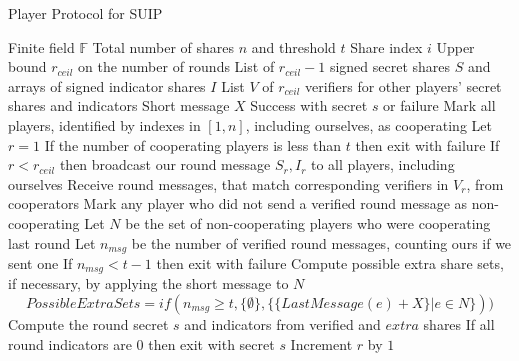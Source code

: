 \documentclass[12pt]{dalcsthesis}
\begin{document}
\begin{algorithm}
  \caption{Player Protocol for SUIP}
  \label{alg:SUIP:Player}
  \begin{algorithmic}
    \INPUT Finite field $\mathbb{F}$
    \INPUT Total number of shares $n$ and threshold $t$
    \INPUT Share index $i$
    \INPUT Upper bound $r_{ceil}$ on the number of rounds
    \INPUT List of $r_{ceil}-1$ signed secret shares $S$ and arrays of signed indicator shares $I$
    \INPUT List $V$ of $r_{ceil}$ verifiers for other players' secret shares and indicators
    \INPUT Short message $X$
    \OUTPUT Success with secret $s$ or failure
    \STATE Mark all players, identified by indexes in $[1, n]$, including ourselves, as cooperating
    \STATE Let $r = 1$
      \STATE If the number of cooperating players is less than $t$ then exit with failure
      \STATE If $r < r_{ceil}$ then broadcast our round message $S_r, I_r$ to all players, including ourselves
      \STATE Receive round messages, that match corresponding verifiers in $V_r$, from cooperators
      \STATE Mark any player who did not send a verified round message as non-cooperating
      \STATE Let $N$ be the set of non-cooperating players who were cooperating last round
      \STATE Let $n_{msg}$ be the number of verified round messages, counting ours if we sent one
      \STATE If $n_{msg} < t - 1$ then exit with failure
      \STATE Compute possible extra share sets, if necessary, by applying the short message to $N$
      		$$PossibleExtraSets = if(n_{msg} \geq t, \{\emptyset\}, \{\{LastMessage(e) + X\} | e \in N\}))$$
        \STATE Compute the round secret $s$ and indicators from verified and $extra$ shares
        \STATE If all round indicators are 0 then exit with secret $s$
      \ENDFOR
      \STATE Increment $r$ by $1$
    \ENDWHILE
  \end{algorithmic}
\end{algorithm}
\end{document}

